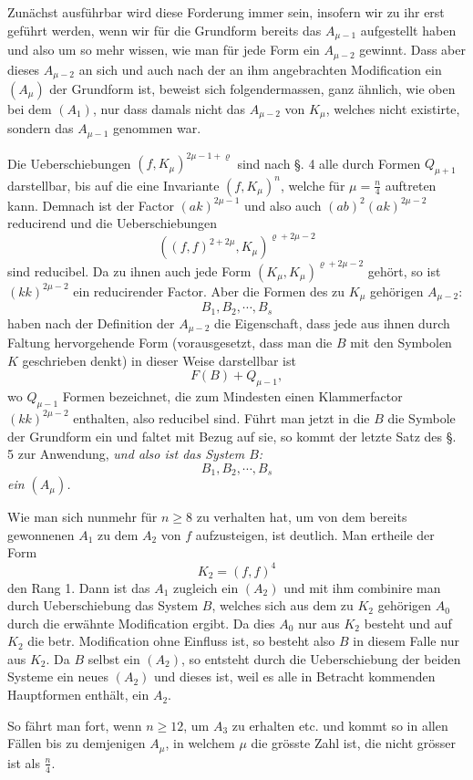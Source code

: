 \documentclass[10pt]{article}
\providecommand{\bdots}{\cdots}
\begin{document}
Zunächst ausführbar wird diese Forderung immer sein, insofern wir zu ihr erst geführt werden, wenn wir für die Grundform bereits das $A_{\mu-1}$ aufgestellt haben und also um so mehr wissen, wie man für jede Form ein $A_{\mu-2}$ gewinnt. Dass aber dieses $A_{\mu-2}$ an sich und auch nach der an ihm angebrachten Modification ein $(A_\mu)$ der Grundform ist, beweist sich folgendermassen, ganz ähnlich, wie oben bei dem $(A_1)$, nur dass damals nicht das $A_{\mu-2}$ von $K_\mu$, welches nicht existirte, sondern das $A_{\mu-1}$ genommen war.

Die Ueberschiebungen $(f,K_\mu)^{2\mu-1+\varrho}$ sind nach §. 4 alle durch Formen $Q_{\mu+1}$ darstellbar, bis auf die eine Invariante $(f,K_\mu)^n$, welche für $\mu=\frac n4$ auftreten kann. Demnach ist der Factor $(ak)^{2\mu-1}$ und also auch $(ab)^2(ak)^{2\mu-2}$ reducirend und die Ueberschiebungen
\[
((f,f)^{2+2\mu},K_\mu)^{\varrho+2\mu-2}
\]
sind reducibel. Da zu ihnen auch jede Form $(K_\mu,K_\mu)^{\varrho+2\mu-2}$ gehört, so ist $(kk)^{2\mu-2}$ ein reducirender Factor. Aber die Formen des zu $K_\mu$ gehörigen $A_{\mu-2}$:
\[
B_1,B_2,\bdots,B_s
\]
haben nach der Definition der $A_{\mu-2}$ die Eigenschaft, dass jede aus ihnen durch Faltung hervorgehende Form (vorausgesetzt, dass man die $B$ mit den Symbolen $K$ geschrieben denkt) in dieser Weise darstellbar ist
\[
F(B)+Q_{\mu-1},
\]
wo $Q_{\mu-1}$ Formen bezeichnet, die zum Mindesten einen Klammerfactor $(kk)^{2\mu-2}$ enthalten, also reducibel sind. Führt man jetzt in die $B$ die Symbole der Grundform ein und faltet mit Bezug auf sie, so kommt der letzte Satz des §. 5 zur Anwendung, \textit{und also ist das System $B$:}
\[
B_1,B_2,\bdots,B_s
\]
\textit{ein $(A_\mu)$.}

Wie man sich nunmehr für $n\geq 8$ zu verhalten hat, um von dem bereits gewonnenen $A_1$ zu dem $A_2$ von $f$ aufzusteigen, ist deutlich. Man ertheile der Form
\[
K_2=(f,f)^4
\]
den Rang 1. Dann ist das $A_1$ zugleich ein $(A_2)$ und mit ihm combinire man durch Ueberschiebung das System $B$, welches sich aus dem zu $K_2$ gehörigen $A_0$ durch die erwähnte Modification ergibt. Da dies $A_0$ nur aus $K_2$ besteht und auf $K_2$ die betr. Modification ohne Einfluss ist, so besteht also $B$ in diesem Falle nur aus $K_2$. Da $B$ selbst ein $(A_2)$, so entsteht durch die Ueberschiebung der beiden Systeme ein neues $(A_2)$ und dieses ist, weil es alle in Betracht kommenden Hauptformen enthält, ein $A_2$.

So fährt man fort, wenn $n\geq 12$, um $A_3$ zu erhalten etc. und kommt so in allen Fällen bis zu demjenigen $A_\mu$, in welchem $\mu$ die grösste Zahl ist, die nicht grösser ist als $\frac n4$.
\end{document}
